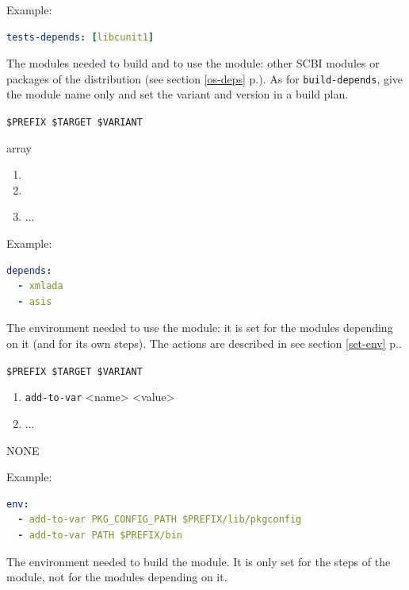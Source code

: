 \documentclass[a4paper,12pt,twoside]{article}
\newcommand{\code}[1]{\texttt{#1}}
\newcommand{\seeref}[1]{see section \ref{#1} p.\pageref{#1}}
\begin{document}
\begin{description}[font=\large\texttt]
	Example:
	\begin{lstlisting}[language={yaml}]
tests-depends: [libcunit1]
\end{lstlisting}

	\item[depends {[}common|<variant>{]}] The modules needed to build and to use the module: other SCBI modules or packages of the distribution (\seeref{os-deps}). As for \code{build-depends}, give the module name only and set the variant and version in a build plan.

	\begin{description}[font=\textit,style=standard]
		\item[parameter] \tabto{2cm} \code{\$PREFIX \$TARGET \$VARIANT}
		\item[return] \tabto{2cm} array
		\begin{enumerate}
			\item <module1>
			\item <module2>
			\item ...
		\end{enumerate}
	\end{description}

	Example:
	\begin{lstlisting}[language={yaml}]
depends:
  - xmlada
  - asis
\end{lstlisting}

	\item[env {[}common|<variant>{]}] The environment needed to use the module: it is set for the modules depending on it (and for its own steps). The actions are described in \seeref{set-env}.
	\begin{description}[font=\textit,style=standard]
		\item[parameter] \tabto{2cm} \code{\$PREFIX \$TARGET \$VARIANT}
		\begin{enumerate}
			\item \code{add-to-var} <name> <value>
			\item ...
		\end{enumerate}
		\item[return] \tabto{2cm} NONE
	\end{description}

	Example:
	\begin{lstlisting}[language={yaml}]
env:
  - add-to-var PKG_CONFIG_PATH $PREFIX/lib/pkgconfig
  - add-to-var PATH $PREFIX/bin
\end{lstlisting}

	\item[build-env {[}common|<variant>{]}] The environment needed to build the module.
	It is only set for the steps of the module, not for the modules depending on it.


\end{description}
\end{document}
